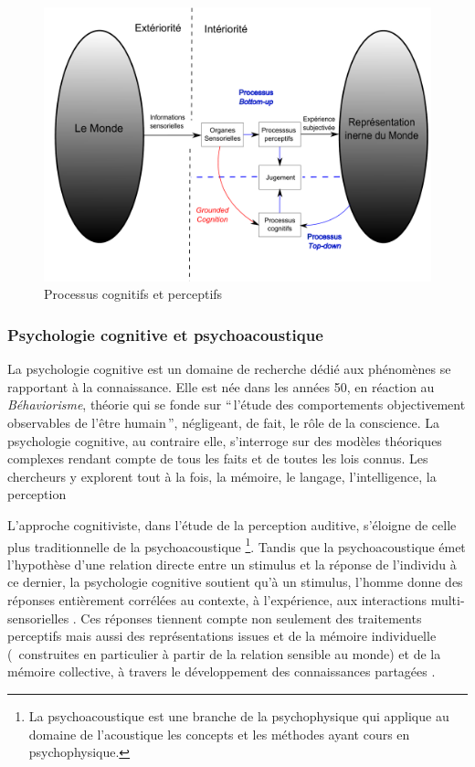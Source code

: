 \begin{figure}[bth]
        \myfloatalign
        \includegraphics[width=\linewidth]{gfx/Representation}
        \caption{Processus cognitifs et perceptifs}\label{fig:processusPercepAndCo}
\end{figure}

\subsubsection{Psychologie cognitive et psychoacoustique}

La psychologie cognitive est un domaine de recherche dédié aux phénomènes se rapportant à la connaissance. Elle est née dans les années 50, en réaction au \emph{Béhaviorisme}, théorie qui se fonde sur ``\,l'étude des comportements objectivement observables de l'être humain\,'', négligeant, de fait, le rôle de la conscience. La psychologie cognitive, au contraire elle, s'interroge sur des modèles théoriques complexes rendant compte de tous les faits et de toutes les lois connus. Les chercheurs y explorent tout à la fois, la mémoire, le langage, l'intelligence, la perception

L'approche cognitiviste, dans l'étude de la perception auditive, s'éloigne de celle plus traditionnelle de la psychoacoustique \footnote{La psychoacoustique est une branche de la psychophysique qui applique au domaine de l'acoustique les concepts et les méthodes ayant cours en psychophysique.}. Tandis que la psychoacoustique émet l'hypothèse d'une relation directe entre un stimulus et la réponse de l'individu à ce dernier, la psychologie cognitive soutient qu'à un stimulus, l'homme donne des réponses entièrement corrélées au contexte, à l'expérience, aux interactions multi-sensorielles \citep{maffiolo_marieParis_1997}. Ces réponses tiennent compte non seulement des traitements perceptifs mais aussi des représentations issues et de la mémoire individuelle (\ie~construites en particulier à partir de la relation sensible au monde) et de la mémoire collective, à travers le développement des connaissances partagées \citep[p. ??]{maffiolo_caracterisation_1999}.


